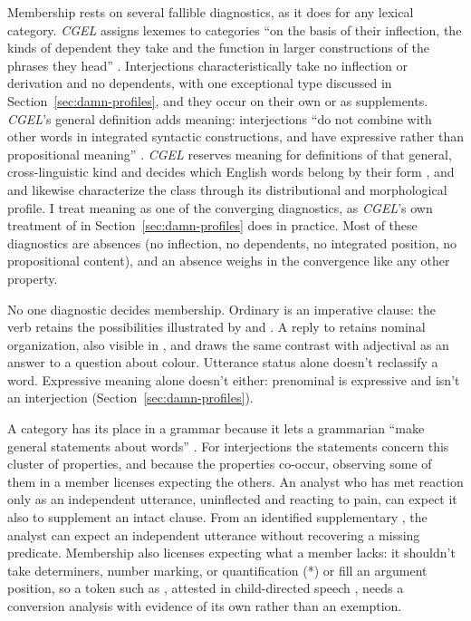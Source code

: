 \documentclass[12pt]{article}
\begin{document}
Membership rests on several fallible diagnostics, as it does for any
lexical category. \textit{CGEL} assigns lexemes to categories \enquote{on
the basis of their inflection, the kinds of dependent they take and the
function in larger constructions of the phrases they head}
\citep[30]{HuddlestonPullum2002}. Interjections characteristically take no
inflection or derivation \citep[106]{ameka1992} and no dependents, with one
exceptional type discussed in Section~\ref{sec:damn-profiles}, and they
occur on their own or as supplements. \textit{CGEL}'s general definition adds meaning:
interjections \enquote{do not combine with other words in integrated
syntactic constructions, and have expressive rather than propositional
meaning} \citep[1361]{HuddlestonPullum2002}. \textit{CGEL} reserves meaning
for definitions of that general, cross-linguistic kind and decides which
English words belong by their form \citep[31--32]{HuddlestonPullum2002},
and \textcite[105--106]{ameka1992} and \textcite[124--125]{wilkins1992}
likewise characterize the class through its distributional and
morphological profile. I treat meaning as one of the converging diagnostics,
as \textit{CGEL}'s own treatment of  in
Section~\ref{sec:damn-profiles} does in practice. Most of these diagnostics
are absences (no inflection, no dependents, no integrated position, no
propositional content), and an absence weighs in the convergence like any
other property.

No one diagnostic decides membership. Ordinary  is an
imperative clause: the verb retains the possibilities illustrated by
 and . A reply 
to  retains nominal organization, also
visible in , and \textcite[124--125]{wilkins1992}
draws the same contrast with adjectival  as an answer to a
question about colour. Utterance status alone doesn't reclassify a word.
Expressive meaning alone doesn't either: prenominal  is
expressive and isn't an interjection (Section~\ref{sec:damn-profiles}).

A category has its place in a grammar because it lets a grammarian
\enquote{make general statements about words} \citep[30]{HuddlestonPullum2002}.
For interjections the statements concern this cluster of properties, and
because the properties co-occur, observing some of them in a member
licenses expecting the others. An analyst who has met reaction
 only as an independent utterance, uninflected and reacting
to pain, can expect it also to supplement an intact clause. From an
identified supplementary , the analyst can expect an
independent utterance without recovering a missing predicate. Membership
also licenses expecting what a member lacks: it shouldn't take determiners,
number marking, or quantification (*) or fill an
argument position, so a token such as , attested in child-directed
speech \citep[36]{stange2016}, needs a conversion analysis with evidence of
its own rather than an exemption.
\end{document}
